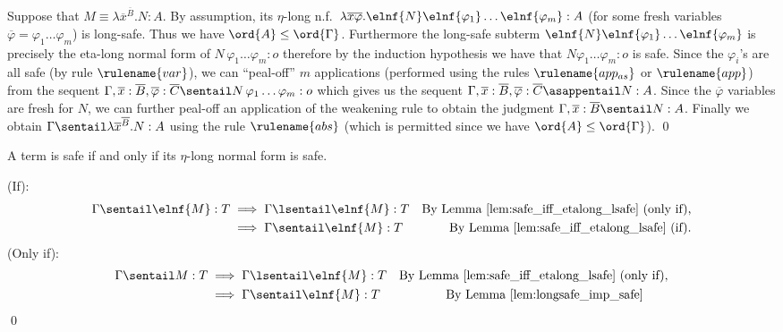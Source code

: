 Suppose that $M \equiv \lambda \overline{x}^{\overline B} . N : A$. By assumption,
its  $\eta$-long n.f.\ $\lambda \overline{x} \overline{\varphi} .
\elnf{N} \elnf{\varphi_1} \ldots \elnf{\varphi_m}: A$ (for some
fresh variables $\overline\varphi = \varphi_1 \ldots \varphi_m$) is long-safe. Thus
we have $\ord{A}\leq\ord{\Gamma}$. Furthermore the long-safe subterm
$\elnf{N} \elnf{\varphi_1} \ldots \elnf{\varphi_m}$ is precisely the
eta-long normal form of $N\, \varphi_1 \ldots \varphi_m : o$ therefore by
the induction hypothesis we have that $N \varphi_1 \ldots \varphi_m
:o$ is safe. Since the $\varphi_i$'s are all safe (by rule
$\rulename{var}$), we can ``peal-off'' $m$ applications (performed using
the rules $\rulename{app_{as}}$ or $\rulename{app}$) from the sequent $\Gamma,
\overline{x}:\overline B,
\overline{\varphi}:\overline C \sentail N\, \varphi_1 \ldots
\varphi_m :o$ which gives us the sequent $\Gamma, \overline{x}:\overline B,
\overline{\varphi}:\overline C \asappentail N : A$. Since the $\overline{\varphi}$
variables are fresh for $N$, we can further peal-off an
application of the weakening rule to obtain the judgment $\Gamma,
\overline{x}:\overline B \sentail N : A$. Finally we obtain $\Gamma \sentail
\lambda \overline{x}^{\overline{B}} . N : A$ using the rule $\rulename{abs}$ (which
is permitted since we have $\ord{A}\leq\ord{\Gamma}$). \qed
\smallskip






\begin{proposition}
\label{prop:safe_iff_elnfsafe}
A term is safe if and only if its $\eta$-long normal form is safe.
\end{proposition}
\proof
(If):
\begin{align*}
  \Gamma \sentail \elnf{M}:T &\implies   \Gamma \lsentail \elnf{M}:T &  \mbox{By Lemma \ref{lem:safe_iff_etalong_lsafe} (only if),} \\
  &\implies   \Gamma \sentail \elnf{M}:T &  \mbox{By Lemma \ref{lem:safe_iff_etalong_lsafe} (if).}
\end{align*}
(Only if):
\begin{align*}
  \Gamma \sentail M:T &\implies   \Gamma \lsentail \elnf{M}:T &  \mbox{By Lemma \ref{lem:safe_iff_etalong_lsafe} (only if),} \\
  &\implies \Gamma \sentail \elnf{M}:T &  \mbox{By Lemma \ref{lem:longsafe_imp_safe}\qquad  }
\end{align*}
\qed


